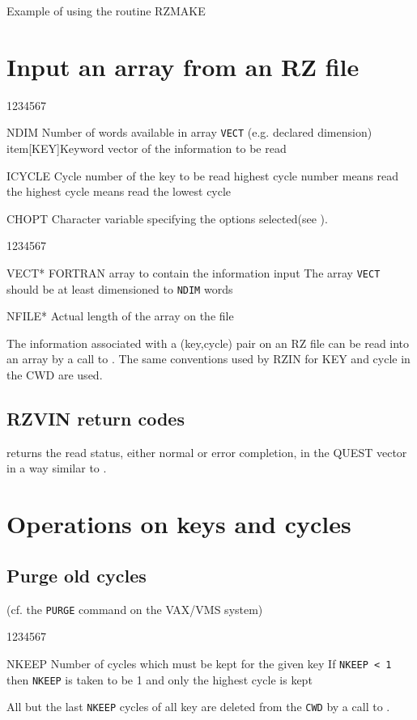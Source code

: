\begin{XMPt}{Example of using the routine RZMAKE}
\section{Input an array from an RZ file}
\Idesc
\begin{DLtt}{1234567}
\item[NDIM]Number of words available in array {\tt VECT} (e.g. declared
dimension)
item[KEY]Keyword vector of the information to be read
\item[ICYCLE]Cycle number of the key to be read
 highest cycle number means read the highest cycle
 means read the lowest cycle
\item[CHOPT]Character variable specifying the options selected(see ).
\end{DLtt}
\Odesc
\begin{DLtt}{1234567}
\item[VECT*]FORTRAN array to contain the information input
\newline The array {\tt VECT} should be at least dimensioned to {\tt NDIM} words
\item[NFILE*]Actual length of the array on the file
\end{DLtt}
\par 
The information associated with a (key,cycle) pair on an RZ file can
be read into an array by a call to .
The same conventions used by RZIN for KEY and cycle in the CWD are used.
\subsection{RZVIN return codes}
\par 
{} returns the read status, either normal or error completion,
in the QUEST vector in a way similar to .
\section{Operations on keys and cycles}
\subsection{Purge old cycles}
(cf. the {\tt PURGE} command on the VAX/VMS system)
\Idesc
\begin{DLtt}{1234567}
\item[NKEEP]Number of cycles which must be kept for the given key
\newline If {\tt NKEEP < 1} then {\tt NKEEP} is taken to be 1 and only the
highest cycle is kept
\end{DLtt}
\par 
All but the last {\tt NKEEP} cycles of all
key are deleted from the {\tt CWD} by a call to .

\end{XMPt}
